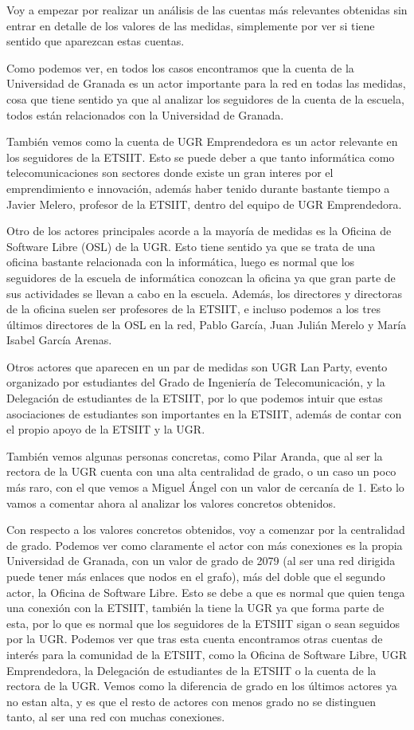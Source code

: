 Voy a empezar por realizar un análisis de las cuentas más relevantes obtenidas sin entrar en detalle de los valores de las medidas, simplemente por ver si tiene sentido que aparezcan estas cuentas.

Como podemos ver, en todos los casos encontramos que la cuenta de la Universidad de Granada es un actor importante para la red en todas las medidas, cosa que tiene sentido ya que al analizar los seguidores de la cuenta de la escuela, todos están relacionados con la Universidad de Granada.

También vemos como la cuenta de UGR Emprendedora es un actor relevante en los seguidores de la ETSIIT. Esto se puede deber a que tanto informática como telecomunicaciones son sectores donde existe un gran interes por el emprendimiento e innovación, además haber tenido durante bastante tiempo a Javier Melero, profesor de la ETSIIT, dentro del equipo de UGR Emprendedora.

Otro de los actores principales acorde a la mayoría de medidas es la Oficina de Software Libre (OSL) de la UGR. Esto tiene sentido ya que se trata de una oficina bastante relacionada con la informática, luego es normal que los seguidores de la escuela de informática conozcan la oficina ya que gran parte de sus actividades se llevan a cabo en la escuela. Además, los directores y directoras de la oficina suelen ser profesores de la ETSIIT, e incluso podemos a los tres últimos directores de la OSL en la red, Pablo García, Juan Julián Merelo y María Isabel García Arenas.

Otros actores que aparecen en un par de medidas son UGR Lan Party, evento organizado por estudiantes del Grado de Ingeniería de Telecomunicación, y la Delegación de estudiantes de la ETSIIT, por lo que podemos intuir que estas asociaciones de estudiantes son importantes en la ETSIIT, además de contar con el propio apoyo de la ETSIIT y la UGR.

También vemos algunas personas concretas, como Pilar Aranda, que al ser la rectora de la UGR cuenta con una alta centralidad de grado, o un caso un poco más raro, con el que vemos a Miguel Ángel con un valor de cercanía de 1. Esto lo vamos a comentar ahora al analizar los valores concretos obtenidos.

Con respecto a los valores concretos obtenidos, voy a comenzar por la centralidad de grado. Podemos ver como claramente el actor con más conexiones es la propia Universidad de Granada, con un valor de grado de 2079 (al ser una red dirigida puede tener más enlaces que nodos en el grafo), más del doble que el segundo actor, la Oficina de Software Libre. Esto se debe a que es normal que quien tenga una conexión con la ETSIIT, también la tiene la UGR ya que forma parte de esta, por lo que es normal que los seguidores de la ETSIIT sigan o sean seguidos por la UGR. Podemos ver que tras esta cuenta encontramos otras cuentas de interés para la comunidad de la ETSIIT, como la Oficina de Software Libre, UGR Emprendedora, la Delegación de estudiantes de la ETSIIT o la cuenta de la rectora de la UGR. Vemos como la diferencia de grado en los últimos actores ya no estan alta, y es que el resto de actores con menos grado no se distinguen tanto, al ser una red con muchas conexiones.

